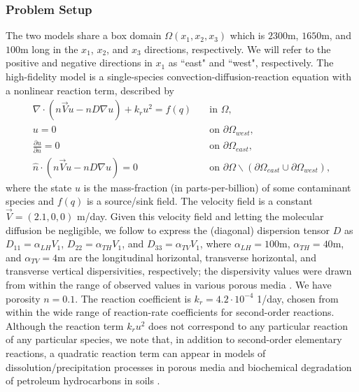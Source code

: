 \subsubsection{Problem Setup} \label{sec:setup3D_diffmesh}

The two models share a box domain $\Omega(x_1,x_2,x_3)$ which is $2300$m, $1650$m, and $100$m long in the $x_1$, $x_2$, and $x_3$ directions, respectively. We will refer to the positive and negative directions in $x_1$ as ``east" and ``west", respectively. The high-fidelity model is a single-species convection-diffusion-reaction equation with a nonlinear reaction term, described by
%
\begin{subequations}
\label{eq:cdvcdrHF3D}
\begin{align}
\nabla\cdot(n\vec{V}u - nD\nabla u) + k_ru^2 = f(q) \quad &\text{in } \Omega, \label{eq:HFeq3D}\\
u = 0 \quad &\text{on } \partial \Omega_{west}, \\
\frac{\partial u}{\partial n} = 0 \quad &\text{on }\partial\Omega_{east}, \\
\hat{n}\cdot(n\vec{V}u - nD\nabla u) = 0 \quad &\text{on }\partial\Omega\backslash(\partial\Omega_{east}\cup\partial\Omega_{west}),
\end{align}
\end{subequations}
%
where the state $u$ is the mass-fraction (in parts-per-billion) of some contaminant species and $f(q)$ is a source/sink field. The velocity field is a constant $\vec{V}=(2.1,0,0)$ m/day. Given this velocity field and letting the molecular diffusion be negligible, we follow \cite{Vestedetal93} to express the (diagonal) dispersion tensor $D$ as $D_{11}=\alpha_{LH}V_1$, $D_{22}=\alpha_{TH}V_1$, and $D_{33}=\alpha_{TV}V_1$, where $\alpha_{LH}=100$m, $\alpha_{TH}=40$m, and $\alpha_{TV}=4$m are the longitudinal horizontal, transverse horizontal, and transverse vertical dispersivities, respectively; the dispersivity values were drawn from within the range of observed values in various porous media \cite{Davis86}. We have porosity $n=0.1$. The reaction coefficient is $k_r=4.2\cdot10^{-4}$ 1/day, chosen from within the wide range of reaction-rate coefficients for second-order reactions. Although the reaction term $k_ru^2$ does not correspond to any particular reaction of any particular species, we note that, in addition to second-order elementary reactions, a quadratic reaction term can appear in models of dissolution/precipitation processes in porous media \cite{Aha97} and biochemical degradation of petroleum hydrocarbons in soils \cite{Jack94}.

